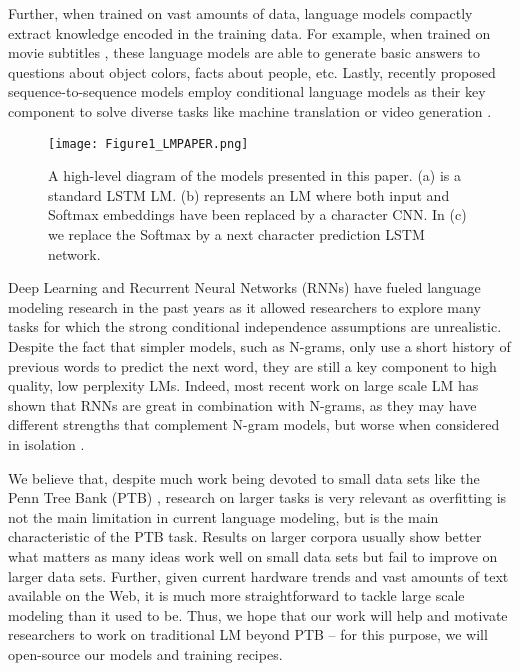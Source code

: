 \documentclass{article}
\begin{document}
Further, when trained on vast amounts of data, language models compactly extract knowledge encoded in the training data. For example, when trained on movie subtitles \cite{serban2015,vinyals2015neural}, these language models are able to generate basic answers to questions about object colors, facts about people, etc. Lastly, recently proposed sequence-to-sequence models employ conditional language models \cite{mikolov2012context} as their key component to solve diverse tasks like machine translation \cite{sutskever2014sequence, cho2014learning, kalchbrenner2014convolutional} or video generation \cite{srivastava2015unsupervised}.

\begin{figure}[t]
\vskip 0.2in
\begin{center}
\centerline{\texttt{[image: Figure1\_LMPAPER.png]}}
\caption{A high-level diagram of the models presented in this paper. (a) is a standard LSTM LM. (b) represents an LM where both input and Softmax embeddings have been replaced by a character CNN. In (c) we replace the Softmax by a next character prediction LSTM network.}
\label{main_figure}
\end{center}
\vspace{-10pt}
\end{figure} 

Deep Learning and Recurrent Neural Networks (RNNs) have fueled language modeling research in the past years as it allowed researchers to explore many tasks for which the strong conditional independence assumptions are unrealistic. Despite the fact that simpler models, such as N-grams, only use a short history of previous words to predict the next word, they are still a key component to high quality, low perplexity LMs. Indeed, most recent work on large scale LM has shown that RNNs are great in combination with N-grams, as they may have different strengths that complement N-gram models, but worse when considered in isolation \cite{mikolov2011empirical, mikolov2012statistical, chelba2013one,williams2015scaling,Blackout,shazeer2015sparse}.

We believe that, despite much work being devoted to small data sets like the Penn Tree Bank (PTB) \cite{marcus1993building}, research on larger tasks is very relevant as overfitting is not the main limitation in current language modeling, but is the main characteristic of the PTB task. Results on larger corpora usually show better what matters as many ideas work well on small data sets but fail to improve on larger data sets. Further, given current hardware trends and vast amounts of text available on the Web, it is much more straightforward to tackle large scale modeling than it used to be. Thus, we hope that our work will help and motivate researchers to work on traditional LM beyond PTB -- for this purpose, we will open-source our models and training recipes. 
\end{document}
